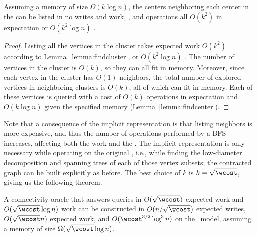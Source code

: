 \begin{lemma}\label{lem:cc-impgraph}
  Assuming a \local{} memory of size $\Omega(k\log n)$, the centers
  neighboring each center in the \clustergraph{} can be listed in no writes and work,
  \depth{}, and operations all $O(k^2)$ in expectation or
  $O(k^2\log n)$ \whp{}.
\end{lemma}
\begin{proof}
  Listing all the vertices in the cluster takes expected work $O(k^2)$
  according to Lemma~\ref{lemma:findcluster}, or $O(k^2\log n)$
  \whp{}.  The number of vertices in the cluster is $O(k)$, so they
  can all fit in \local{} memory. Moreover, since each vertex in the
  cluster has $O(1)$ neighbors, the total number of explored vertices
  in neighboring clusters is $O(k)$, all of which can fit in \local{}
  memory.  Each of these vertices is queried with a cost of $O(k)$
  operations in expectation and $O(k\log n)$ \whp{} given the
  specified \local{} memory (Lemma~\ref{lemma:findcenter}).
\end{proof}

Note that a consequence of the implicit representation is that listing
neighbors is more expensive, and thus the number of operations
performed by a BFS increases, affecting both the work and the
\depth{}.  The implicit representation is only necessary while
operating on the original \clustergraph{}, i.e., while finding the
low-diameter decomposition and spanning trees of each of those vertex
subsets; the contracted graph can be built explicitly as before.  The
best choice of $k$ is $k=\sqrt{\wcost}$, giving us the following
theorem.%

\begin{theorem}\label{thm:cc-oracle}
  A connectivity oracle that answers queries in $O(\sqrt{\wcost})$
  expected work and $O(\sqrt{\wcost}\log n)$ work \whp{} can be
  constructed in $O(n/\sqrt{\wcost})$ expected writes,
  $O(\sqrt{\wcost} n)$ expected work, and $O(\wcost^{3/2}\log^3n)$
  \depth{} \whp{} on the \ourmodel\ model, assuming a \local{} memory of
  size $\Omega(\sqrt{\wcost}\log n)$.
\end{theorem}

